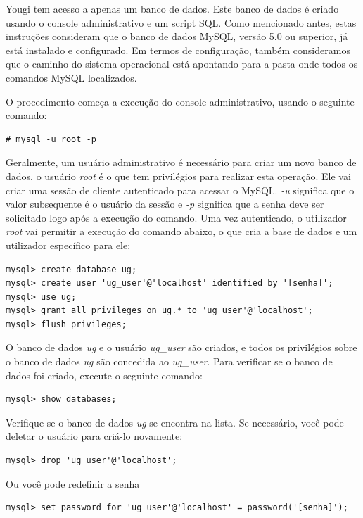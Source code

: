 \documentclass[envcountsame,envcountchap]{svmono}
\begin{document}
Yougi tem acesso a apenas um banco de dados. Este banco de dados é criado usando o console administrativo e um script SQL. Como mencionado antes, estas instruções consideram que o banco de dados MySQL, versão 5.0 ou superior, já está instalado e configurado. Em termos de configuração, também consideramos que o caminho do sistema operacional está apontando para a pasta onde todos os comandos MySQL localizados.

O procedimento começa a execução do console administrativo, usando o seguinte comando:

\begin{verbatim}
# mysql -u root -p
\end{verbatim}

Geralmente, um usuário administrativo é necessário para criar um novo banco de dados. o usuário \textit{root} é o que tem privilégios para realizar esta operação. Ele vai criar uma sessão de cliente autenticado para acessar o MySQL. \textit{-u} significa que o valor subsequente é o usuário da sessão e \textit{-p} significa que a senha deve ser solicitado logo após a execução do comando. Uma vez autenticado, o utilizador \textit{root} vai permitir a execução do comando abaixo, o que cria a base de dados e um utilizador específico para ele:

\begin{verbatim}
mysql> create database ug;
mysql> create user 'ug_user'@'localhost' identified by '[senha]';
mysql> use ug;
mysql> grant all privileges on ug.* to 'ug_user'@'localhost';
mysql> flush privileges;
\end{verbatim}

O banco de dados \textit{ug} e o usuário \textit{ug\_user} são criados, e todos os privilégios sobre o banco de dados \textit{ug} são concedida ao \textit{ug\_user}. Para verificar se o banco de dados foi criado, execute o seguinte comando:

\begin{verbatim}
mysql> show databases;
\end{verbatim}

Verifique se o banco de dados \textit{ug} se encontra na lista. Se necessário, você pode deletar o usuário para criá-lo novamente:

\begin{verbatim}
mysql> drop 'ug_user'@'localhost';
\end{verbatim}

Ou você pode redefinir a senha

\begin{verbatim}
mysql> set password for 'ug_user'@'localhost' = password('[senha]');
\end{verbatim}
\end{document}
